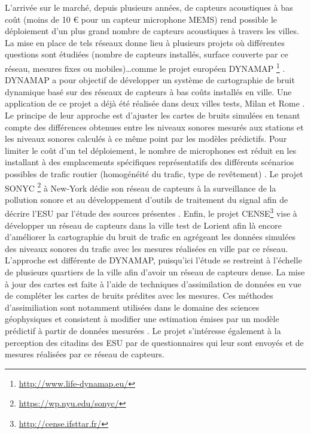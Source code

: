 L'arrivée sur le marché, depuis plusieurs années, de capteurs acoustiques à bas coût (moins de 10 € pour un capteur microphone MEMS) \cite{van2010use} rend possible le déploiement d'un plus grand nombre de capteurs acoustiques à travers les villes. La mise en place de tels réseaux donne lieu à plusieurs projets où différentes questions sont étudiées (nombre de capteurs installés, surface couverte par ce réseau, mesures fixes ou mobiles)\dots  comme le projet européen DYNAMAP \footnote{\url{http://www.life-dynamap.eu/}} \cite{dynamap_2016}. DYNAMAP a pour objectif de développer un système de cartographie de bruit dynamique basé sur des réseaux de capteurs à bas coûts installés en ville. Une application de ce projet a déjà été réalisée dans deux villes tests, Milan et Rome \cite{bellucci_life_2017}.
Le principe de leur approche est d'ajuster les cartes de bruits simulées en tenant compte des différences obtenues entre les niveaux sonores mesurés aux stations et les niveaux sonores calculés à ce même point par les modèles prédictifs. Pour limiter le coût d'un tel déploiement, le nombre de microphones est réduit en les installant à des emplacements spécifiques représentatifs des différents scénarios possibles de trafic routier (homogénéité du trafic, type de revêtement) \cite{zambon2017life}.
Le projet SONYC \footnote{\url{https://wp.nyu.edu/sonyc/}} à New-York dédie son réseau de capteurs à la surveillance de la pollution sonore et au développement d'outils de traitement du signal afin de décrire l'ESU par l'étude des sources présentes \cite{mydlarz2017noise}.
Enfin, le projet CENSE\footnote{\url{http://cense.ifsttar.fr/}} vise à développer un réseau de capteurs dans la ville test de Lorient afin là encore d'améliorer la cartographie du bruit de trafic en agrégeant les données simulées des niveaux sonores du trafic avec les mesures réalisées en ville par ce réseau. L'approche est différente de DYNAMAP, puisqu'ici l'étude se restreint à l'échelle de plusieurs quartiers de la ville afin d'avoir un réseau de capteurs dense. La mise à jour des cartes est faite à l'aide de techniques d'assimilation de données en vue de compléter les cartes de bruits prédites avec les mesures.
Ces méthodes d'assimiliation sont notamment utilisées dans le domaine des sciences géophysiques et consistent à modifier une estimation émises par un modèle prédictif à partir de données mesurées \cite{wu2008comparison}.
Le projet s'intéresse également à la perception des citadins des ESU par de questionnaires qui leur sont envoyés et de mesures réalisées par ce réseau de capteurs.

